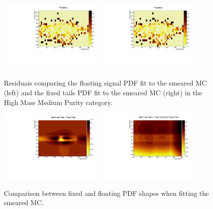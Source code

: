 \begin{figure}[h]
  \centering
  \includegraphics[width=0.45\textwidth]{figures/sec-systematics/HMMPC_up_tails_notfixed_central_res.pdf}\hfil
  \includegraphics[width=0.45\textwidth]{figures/sec-systematics/HMMPC_up_tails_fixed_central_res.pdf}\hfil
  \caption{Residuais comparing the floating signal PDF fit to the smeared MC (left) and the fixed tails PDF fit to the smeared MC (right) in the High Mass Medium Purity category.}
  \label{fig:res_smear}
\end{figure}

\begin{figure}[h]
  \centering
  \includegraphics[width=0.45\textwidth]{figures/sec-systematics/fixnfix.pdf}\hfil
  \includegraphics[width=0.45\textwidth]{figures/sec-systematics/fixnfixE.pdf}\hfil
  \caption{Comparison between fixed and floating PDF shapes when fitting the smeared MC.}
  \label{fig:comp_smear}
\end{figure}

